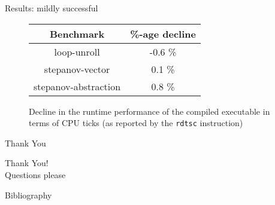 \documentclass[xcolor=dvipsnames]{beamer}
\begin{document}
\begin{frame}{Results: mildly successful}
  \begin{figure}[htbp]
    \centering
    \renewcommand{\arraystretch}{1.5}

    \begin{tabular}{| c | c |}
      \hline
      \textbf{Benchmark} & \textbf{\%-age decline} \\ \hline

      loop-unroll & -0.6 \% \\
      stepanov-vector & 0.1 \% \\
      stepanov-abstraction & 0.8 \% \\
      \hline
    \end{tabular}
    \caption{Decline in the runtime performance of the compiled
      executable in terms of CPU ticks (as reported by the
      \texttt{rdtsc} instruction)}
    \label{fig:performance-cost}
  \end{figure}
\end{frame}

\begin{frame}{Thank You}
  \begin{center}
    Thank You!\\
    Questions please
  \end{center}
\end{frame}

\begin{frame}{Bibliography}
  \printbibliography
\end{frame}
\end{document}
